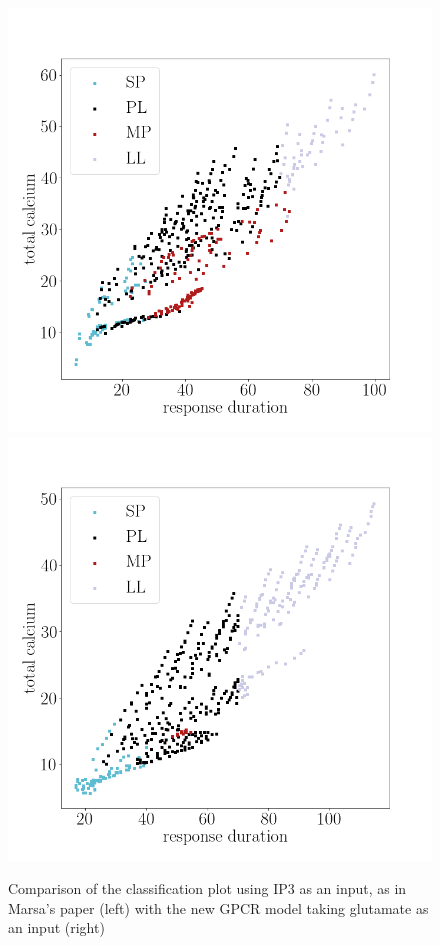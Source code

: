 \documentclass[12pt]{article}
\begin{document}
\begin{figure}[H]
	\includegraphics[width=0.45\linewidth]{ip3_classification.png}
	\includegraphics[width=0.45\linewidth]{glut_classification_new2.png}
	\centering
	\caption{Comparison of the classification plot using IP3 as an input, as in Marsa's paper (left) with the new GPCR model taking glutamate as an input (right)}
	\label{fig:glut_classification_2}
\end{figure}

\pagebreak



\end{document}
